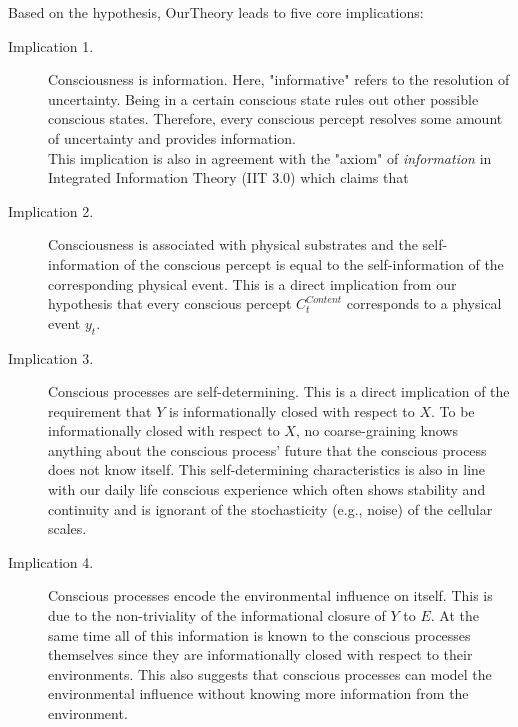 \documentclass[utf8]{article}
\begin{document}
        Based on the hypothesis, \ac{OurTheory} leads to five core implications: 
        \begin{description}
            \item[Implication 1.] 
            Consciousness is information. Here, "informative" refers to the resolution of uncertainty. Being in a certain conscious state rules out other possible conscious states. Therefore, every conscious percept resolves some amount of uncertainty and provides information. \\ 
            This implication is also in agreement with the "axiom" of \textit{information} in Integrated Information Theory (IIT 3.0) which claims that 
            
            \item[Implication 2.] 
            Consciousness is associated with physical substrates and the self-information of the conscious percept is equal to the self-information of the corresponding physical event. This is a direct implication from our hypothesis that every conscious percept $C_t^{Content}$ corresponds to a physical event $y_t$. 
            
            
            \item[Implication 3.] 
            Conscious processes are self-determining. This is a direct implication of the requirement that $Y$ is informationally closed with respect to $X$. To be informationally closed with respect to $X$, no coarse-graining knows anything about the conscious process' future that the conscious process does not know itself. This self-determining characteristics is also in line with our daily life conscious experience which often shows stability and continuity and is ignorant of the stochasticity (e.g., noise) of the cellular scales.
            

            
            \item[Implication 4.] 
            Conscious processes encode the environmental influence on itself. This is due to the non-triviality of the informational closure of $Y$ to $E$. At the same time all of this information is known to the conscious processes themselves since they are informationally closed with respect to their environments. This also suggests that conscious processes can model the environmental influence without knowing more information from the environment.
            

\end{description}
\end{document}
